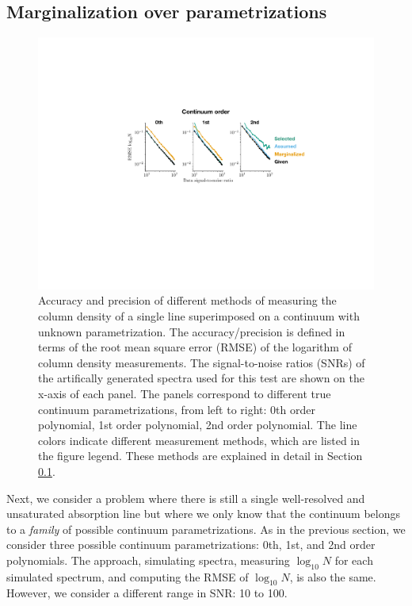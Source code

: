 \documentclass[manuscript]{aastex62}
\begin{document}
\subsection{Marginalization over parametrizations}
\label{sec:marginalization-over-parametrizations}
\begin{figure}
  \includegraphics[width=\linewidth]{figures/order_strategies_labeled.pdf}
  \caption{
  Accuracy and precision of different methods of measuring the column density of a single line superimposed on a continuum with unknown parametrization.
  The accuracy/precision is defined in terms of the root mean square error (RMSE) of the logarithm of column density measurements.
  The signal-to-noise ratios (SNRs) of the artifically generated spectra used for this test are shown on the x-axis of each panel.
  The panels correspond to different true continuum parametrizations, from left to right: 0th order polynomial, 1st order polynomial, 2nd order polynomial.
  The line colors indicate different measurement methods, which are listed in the figure legend.
  These methods are explained in detail in Section \ref{sec:marginalization-over-parametrizations}.
  }
  \label{fig:order-unknown-comparison}
\end{figure}
Next, we consider a problem where there is still a single well-resolved and unsaturated absorption line but where we only know that the continuum belongs to a \emph{family} of possible continuum parametrizations.
As in the previous section, we consider three possible continuum parametrizations: 0th, 1st, and 2nd order polynomials.
The approach, simulating spectra, measuring $\log_{10}N$ for each simulated spectrum, and computing the RMSE of $\log_{10}N$, is also the same.
However, we consider a different range in SNR: 10 to 100.
\end{document}
